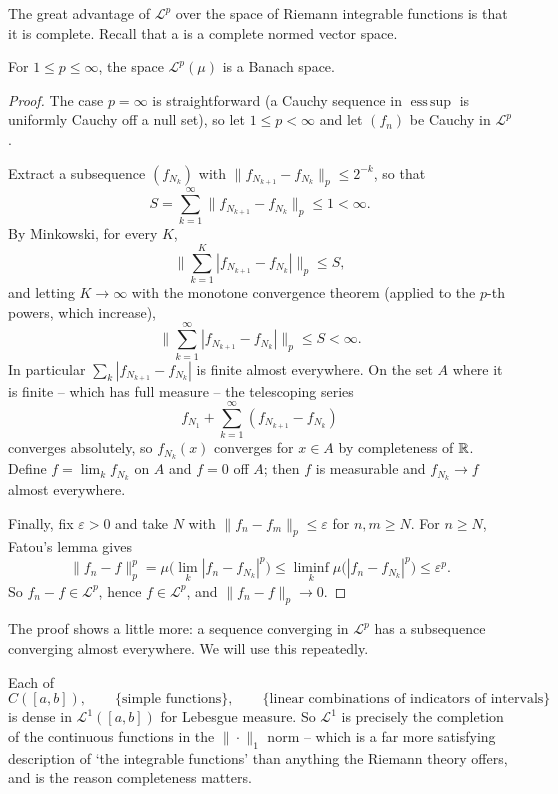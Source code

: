 \documentclass[a4paper]{scrartcl}
\newcommand{\cL}{\mathcal{L}}
\DeclareMathOperator*{\esssup}{ess\,sup}
\begin{document}
The great advantage of $\cL^p$ over the space of Riemann integrable functions is that it is complete. Recall that a  is a complete normed vector space.

\begin{theorem}\label{thm:riesz-fischer}
	For $1 \leq p\leq\infty$, the space $\cL^p(\mu)$ is a Banach space.
\end{theorem}
\begin{proof}
	The case $p=\infty$ is straightforward (a Cauchy sequence in $\esssup$ is uniformly Cauchy off a null set), so let $1\leq p<\infty$ and let $(f_n)$ be Cauchy in $\cL^p$.

	Extract a subsequence $(f_{N_k})$ with $\|f_{N_{k+1}}-f_{N_k}\|_p \leq 2^{-k}$, so that
	$$
	S = \sum_{k=1}^\infty \|f_{N_{k+1}}-f_{N_k}\|_p \leq 1 < \infty.
	$$
	By Minkowski, for every $K$,
	$$
	\Big\| \sum_{k=1}^K |f_{N_{k+1}}-f_{N_k}| \Big\|_p \leq S,
	$$
	and letting $K \to \infty$ with the monotone convergence theorem (applied to the $p$-th powers, which increase),
	$$
	\Big\| \sum_{k=1}^\infty |f_{N_{k+1}}-f_{N_k}| \Big\|_p \leq S < \infty.
	$$
	In particular $\sum_k |f_{N_{k+1}}-f_{N_k}|$ is finite almost everywhere. On the set $A$ where it is finite -- which has full measure -- the telescoping series
	$$
	f_{N_1} + \sum_{k=1}^\infty (f_{N_{k+1}}-f_{N_k})
	$$
	converges absolutely, so $f_{N_k}(x)$ converges for $x \in A$ by completeness of $\mathbb{R}$. Define $f = \lim_k f_{N_k}$ on $A$ and $f = 0$ off $A$; then $f$ is measurable and $f_{N_k}\to f$ almost everywhere.

	Finally, fix $\varepsilon>0$ and take $N$ with $\|f_n - f_m\|_p \leq \varepsilon$ for $n,m\geq N$. For $n \geq N$, Fatou's lemma gives
	$$
	\|f_n - f\|_p^p = \mu\big(\lim_k |f_n - f_{N_k}|^p\big) \leq \liminf_k \mu\big(|f_n-f_{N_k}|^p\big) \leq \varepsilon^p.
	$$
	So $f_n - f \in \cL^p$, hence $f \in \cL^p$, and $\|f_n-f\|_p \to 0$.
\end{proof}

\begin{remark}
	The proof shows a little more: a sequence converging in $\cL^p$ has a subsequence converging almost everywhere. We will use this repeatedly.
\end{remark}

\begin{remark}
	Each of
	$$
	C([a,b]), \qquad \{\text{simple functions}\}, \qquad \{\text{linear combinations of indicators of intervals}\}
	$$
	is dense in $\cL^1([a,b])$ for Lebesgue measure. So $\cL^1$ is precisely the completion of the continuous functions in the $\|\cdot\|_1$ norm -- which is a far more satisfying description of `the integrable functions' than anything the Riemann theory offers, and is the reason completeness matters.
\end{remark}
\end{document}
